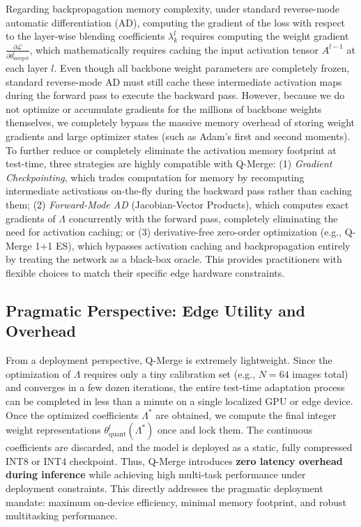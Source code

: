 Regarding backpropagation memory complexity, under standard reverse-mode automatic differentiation (AD), computing the gradient of the loss with respect to the layer-wise blending coefficients $\lambda^l_k$ requires computing the weight gradient $\frac{\partial \mathcal{L}}{\partial \theta^l_{\text{merged}}}$, which mathematically requires caching the input activation tensor $A^{l-1}$ at each layer $l$. Even though all backbone weight parameters are completely frozen, standard reverse-mode AD must still cache these intermediate activation maps during the forward pass to execute the backward pass. However, because we do not optimize or accumulate gradients for the millions of backbone weights themselves, we completely bypass the massive memory overhead of storing weight gradients and large optimizer states (such as Adam's first and second moments). To further reduce or completely eliminate the activation memory footprint at test-time, three strategies are highly compatible with Q-Merge: (1) \textit{Gradient Checkpointing}, which trades computation for memory by recomputing intermediate activations on-the-fly during the backward pass rather than caching them; (2) \textit{Forward-Mode AD} (Jacobian-Vector Products), which computes exact gradients of $\Lambda$ concurrently with the forward pass, completely eliminating the need for activation caching; or (3) derivative-free zero-order optimization (e.g., Q-Merge 1+1 ES), which bypasses activation caching and backpropagation entirely by treating the network as a black-box oracle. This provides practitioners with flexible choices to match their specific edge hardware constraints.

\subsection{Pragmatic Perspective: Edge Utility and Overhead}
From a deployment perspective, Q-Merge is extremely lightweight. Since the optimization of $\Lambda$ requires only a tiny calibration set (e.g., $N=64$ images total) and converges in a few dozen iterations, the entire test-time adaptation process can be completed in less than a minute on a single localized GPU or edge device. 
Once the optimized coefficients $\Lambda^*$ are obtained, we compute the final integer weight representations $\theta^l_{\text{quant}}(\Lambda^*)$ once and lock them. The continuous coefficients are discarded, and the model is deployed as a static, fully compressed INT8 or INT4 checkpoint. Thus, Q-Merge introduces \textbf{zero latency overhead during inference} while achieving high multi-task performance under deployment constraints. This directly addresses the pragmatic deployment mandate: maximum on-device efficiency, minimal memory footprint, and robust multitasking performance.


